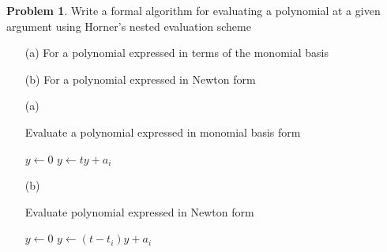\documentclass[a4paper]{book}
\makeatletter
\renewcommand{\algorithmicrequire}{\textbf{输入:}}
\renewcommand{\algorithmicensure}{\textbf{输出:}}
\renewcommand{\algorithmicrequire}{\textbf{Input : }}
\renewcommand{\algorithmicrequire}{\textbf{Precondition : }}
\renewcommand{\algorithmicensure}{\textbf{Output : }}
\renewcommand{\algorithmicensure}{\textbf{Postcondition : }}
\newenvironment{sol}[1][\solname]{\par
  \pushQED{\qed}
  \normalfont \topsep6\p@\@plus6\p@\relax
  \trivlist
  \item[\hskip\labelsep
        \itshape
    #1\@addpunct{.}]\ignorespaces
}{\popQED\endtrivlist\@endpefalse}
\providecommand{\solname}{Solution}
\numberwithin{equation}{chapter}
\theoremstyle{definition}
\newtheorem{pro}{Problem}
\makeatother
\begin{document}
  \begin{pro}
    Write a formal algorithm for evaluating a polynomial
    at a given argument using Horner's nested evaluation scheme
    \begin{itemize}
    \item[(a)]
      For a polynomial expressed in terms of the monomial basis
  
    \item[(b)]
      For a polynomial expressed in Newton form
    \end{itemize}
  \end{pro}
  \begin{sol}
    \begin{itemize}
  
      \item[(a)] \
    \begin{algorithm}[htb]
    \caption{Evaluate a polynomial expressed in monomial basis form}
    \begin{algorithmic}[1]
      \State
      $y\leftarrow 0$
      \State $y \leftarrow ty + a_i$
      \EndFor
    \end{algorithmic}
  \end{algorithm}
  
  \item[(b)] \
    \begin{algorithm}[htb]
      \caption{Evaluate polynomial expressed in Newton form}
    \begin{algorithmic}[1]
      \State
      $y\leftarrow 0$
      \For{$i=n$ to $1$}
      \State $y \leftarrow (t-t_i)y + a_i$
      \EndFor
    \end{algorithmic}
  \end{algorithm}  
  \end{itemize}
  \end{sol}
\end{document}
